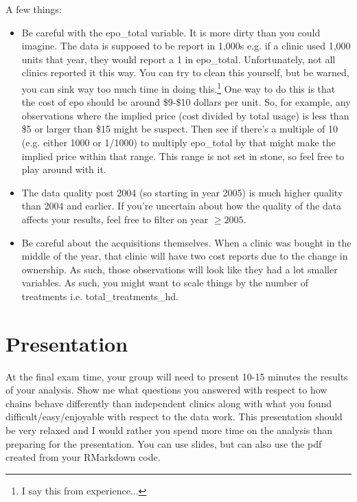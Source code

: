 \documentclass{article}
\begin{document}
	A few things:
	\begin{itemize}
		\item Be careful with the epo\_total variable. It is more dirty than you could imagine. The data is supposed to be report in 1,000s e.g. if a clinic used 1,000 units that year, they would report a 1 in epo\_total. Unfortunately, not all clinics reported it this way. You can try to clean this yourself, but be warned, you can sink way too much time in doing this.\footnote{I say this from experience...} One way to do this is that the cost of epo should be around \$9-\$10 dollars per unit. So, for example, any observations where the implied price (cost divided by total usage) is less than \$5 or larger than \$15 might be suspect. Then see if there's a multiple of 10 (e.g. either 1000 or 1/1000) to multiply epo\_total by that might make the implied price within that range. This range is not set in stone, so feel free to play around with it.
		\item The data quality post 2004 (so starting in year 2005) is much higher quality than 2004 and earlier. If you're uncertain about how the quality of the data affects your results, feel free to filter on year $\geq 2005$.
		\item Be careful about the acquisitions themselves. When a clinic was bought in the middle of the year, that clinic will have two cost reports due to the change in ownership. As such, those observations will look like they had a lot smaller variables. As such, you might want to scale things by the number of treatments i.e. total\_treatments\_hd.
	\end{itemize}
	
\section*{Presentation}

At the final exam time, your group will need to present 10-15 minutes the results of your analysis. Show me what questions you answered with respect to how chains behave differently than independent clinics along with what you found difficult/easy/enjoyable with respect to the data work. This presentation should be very relaxed and I would rather you spend more time on the analysis than preparing for the presentation. You can use slides, but can also use the pdf created from your RMarkdown code.
\end{document}

